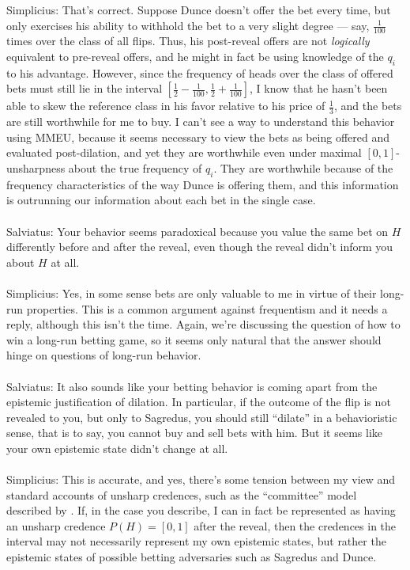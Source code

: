 \documentclass[letterpaper,12pt]{article}
\begin{document}
Simplicius: That's correct. Suppose Dunce doesn't offer the bet every time, but only exercises his ability to withhold the bet to a very slight degree --- say, $\frac{1}{100}$ times over the class of all flips. Thus, his post-reveal offers are not \emph{logically} equivalent to pre-reveal offers, and he might in fact be using knowledge of the $q_i$ to his advantage. However, since the frequency of heads over the class of offered bets must still lie in the interval $[\frac{1}{2} - \frac{1}{100}, \frac{1}{2} + \frac{1}{100}]$, I know that he hasn't been able to skew the reference class in his favor relative to his price of $\frac{1}{3}$, and the bets are still worthwhile for me to buy. I can't see a way to understand this behavior using MMEU, because it seems necessary to view the bets as being offered and evaluated post-dilation, and yet they are worthwhile even under maximal $[0, 1]$-unsharpness about the true frequency of $q_i$. They are worthwhile because of the frequency characteristics of the way Dunce is offering them, and this information is outrunning our information about each bet in the single case.\\ \\
Salviatus: Your behavior seems paradoxical because you value the same bet on $H$ differently before and after the reveal, even though the reveal didn't inform you about $H$ at all.\\ \\
Simplicius: Yes, in some sense bets are only valuable to me in virtue of their long-run properties. This is a common argument against frequentism and it needs a reply, although this isn't the time. Again, we're discussing the question of how to win a long-run betting game, so it seems only natural that the answer should hinge on questions of long-run behavior.\\ \\
Salviatus: It also sounds like your betting behavior is coming apart from the epistemic justification of dilation. In particular, if the outcome of the flip is not revealed to you, but only to Sagredus, you should still ``dilate'' in a behavioristic sense, that is to say, you cannot buy and sell bets with him. But it seems like your own epistemic state didn't change at all.\\ \\
Simplicius: This is accurate, and yes, there's some tension between my view and standard accounts of unsharp credences, such as the ``committee'' model described by \cite{Joyce2010-JOYADO-2}. If, in the case you describe, I can in fact be represented as having an unsharp credence $P(H) = [0, 1]$ after the reveal, then the credences in the interval may not necessarily represent my own epistemic states, but rather the epistemic states of possible betting adversaries such as Sagredus and Dunce.\\ \\
\end{document}
